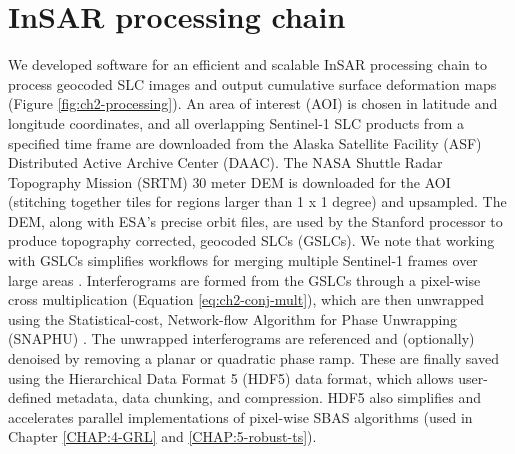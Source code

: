 \section{InSAR processing chain}
\label{sec:ch2-processing}
We developed software for an efficient and scalable InSAR processing chain to process geocoded SLC images and output cumulative surface deformation maps (Figure \ref{fig:ch2-processing}). An area of interest (AOI) is chosen in latitude and longitude coordinates, and all overlapping Sentinel-1 SLC products from a specified time frame are downloaded from the Alaska Satellite Facility (ASF) Distributed Active Archive Center (DAAC). The NASA Shuttle Radar Topography Mission (SRTM) \citep{Nasa2013NasaShuttleRadar} 30 meter DEM is downloaded for the AOI (stitching together tiles for regions larger than 1 x 1 degree) and upsampled.
The DEM, along with ESA's precise orbit files, are used by the Stanford processor \cite{Zheng2017PhaseCorrectionSingle, Zebker2017UserFriendlyInsar} to produce topography corrected, geocoded SLCs (GSLCs).
We note that working with GSLCs simplifies workflows for merging multiple Sentinel-1 frames over large areas \citep{Zheng2019ImagingCascadiaSlow}.
Interferograms are formed from the GSLCs through a pixel-wise cross multiplication (Equation \eqref{eq:ch2-conj-mult}), which are then unwrapped using the Statistical-cost, Network-flow Algorithm for Phase Unwrapping (SNAPHU) \citep{Chen2001TwoDimensionalPhase}. The unwrapped interferograms are referenced and (optionally) denoised by removing a planar or quadratic phase ramp. These are finally saved using the Hierarchical Data Format 5 (HDF5) data format, which allows user-defined metadata, data chunking, and compression.  HDF5 also simplifies and accelerates parallel implementations of pixel-wise SBAS algorithms (used in Chapter \ref{CHAP:4-GRL} and \ref{CHAP:5-robust-ts}).



